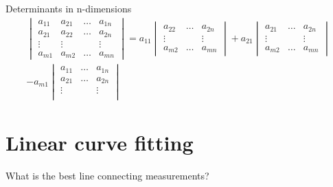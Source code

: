\documentclass[notes]{beamer}
\begin{document}
    \begin{frame}{Determinants in n-dimensions}
      \begin{align*}
      \begin{vmatrix}
        a_{11} & a_{21} & \dots & a_{1n} \\
        a_{21} & a_{22} & \dots & a_{2n} \\
        \vdots & \vdots &       & \vdots \\
        a_{m1} & a_{m2} & \dots & a_{mn}
      \end{vmatrix}
    = a_{11} \begin{vmatrix}
      a_{22} & \dots & a_{2n} \\
      \vdots &        & \vdots \\
      a_{m2} & \dots & a_{mn}
    \end{vmatrix}
    + a_{21} 
    \begin{vmatrix}
      a_{21} & \dots & a_{2n} \\
      \vdots &        & \vdots \\
      a_{m2} & \dots & a_{mn}
    \end{vmatrix}
    \\
    - a_{m1}
    \begin{vmatrix} 
      a_{11} & \dots & a_{1n} \\
      a_{21} & \dots & a_{2n} \\
      \vdots &        & \vdots \\
    \end{vmatrix}
    \end{align*}
    \end{frame}


  \section{Linear curve fitting}
    \begin{frame}{What is the best line connecting measurements?}
      \begin{figure}
      \centering
      
      \end{figure}
    \end{frame}
\end{document}
